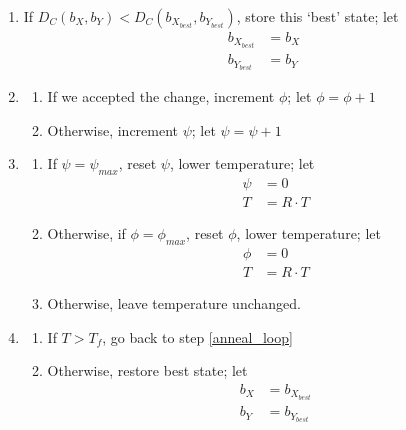 \documentclass[10pt,twoside,titlepage]{article}
\begin{document}
\begin{enumerate}
\begin{enumerate}
    \end{enumerate}
    \item If $D_C(b_X, b_Y) < D_C(b_{X_{best}}, b_{Y_{best}})$, store this `best' state; let
    \begin{align}
        b_{X_{best}}&=b_X\\
        b_{Y_{best}}&=b_Y
    \end{align}
    \item
    \begin{enumerate}
        \item If we accepted the change, increment $\phi$; let $\phi=\phi+1$
        \item Otherwise, increment $\psi$; let $\psi=\psi+1$
    \end{enumerate}
    \item
    \begin{enumerate}
        \item If $\psi=\psi_{max}$, reset $\psi$, lower temperature; let
        \begin{align}
            \psi &= 0\\
            T &= R\cdot T
        \end{align}
        \item Otherwise, if $\phi=\phi_{max}$, reset $\phi$, lower temperature; let
        \begin{align}
            \phi &= 0\\
            T &= R\cdot T
        \end{align}
        \item Otherwise, leave temperature unchanged.
    \end{enumerate}
    \item 
    \begin{enumerate}
        \item If $T > T_f$, go back to step \ref{anneal_loop}
        \item Otherwise, restore best state; let
        \begin{align}
            b_X&=b_{X_{best}}\\
            b_Y&=b_{Y_{best}}
        \end{align}
    \end{enumerate}
\end{enumerate}
\end{document}
